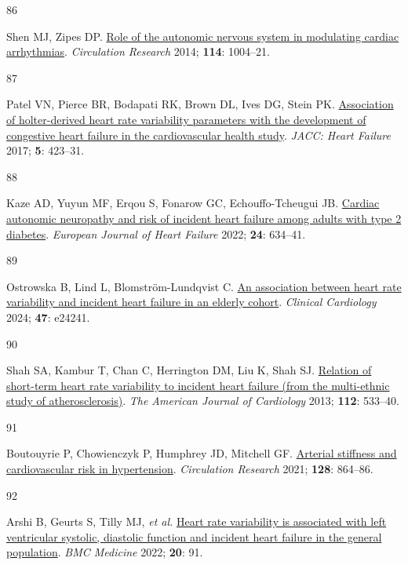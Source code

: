 \documentclass[
  a4paper,
  headsepline=true,
  open=any]{scrbook}
\newlength{\cslhangindent}
\newlength{\csllabelwidth}
\newlength{\cslentryspacingunit} %
\newenvironment{CSLReferences}[2] %
 {%
  \setlength{\parindent}{0pt}
  \ifodd #1
  \let\oldpar\par
  \def\par{\hangindent=\cslhangindent\oldpar}
  \fi
  \setlength{\parskip}{#2\cslentryspacingunit}
 }%
 {}
\newcommand{\CSLLeftMargin}[1]{\parbox[t]{\csllabelwidth}{#1}}
\newcommand{\CSLRightInline}[1]{\parbox[t]{\linewidth - \csllabelwidth}{#1}\break}
\begin{document}
\begin{CSLReferences}{0}{0}
\leavevmode{}%
\CSLLeftMargin{86 }%
\CSLRightInline{Shen MJ, Zipes DP.
\href{https://doi.org/10.1161/CIRCRESAHA.113.302549}{Role of the
autonomic nervous system in modulating cardiac arrhythmias}.
\emph{Circulation Research} 2014; \textbf{114}: 1004--21.}

\leavevmode{}%
\CSLLeftMargin{87 }%
\CSLRightInline{Patel VN, Pierce BR, Bodapati RK, Brown DL, Ives DG,
Stein PK. \href{https://doi.org/10.1016/j.jchf.2016.12.015}{Association
of holter-derived heart rate variability parameters with the development
of congestive heart failure in the cardiovascular health study}.
\emph{JACC: Heart Failure} 2017; \textbf{5}: 423--31.}

\leavevmode{}%
\CSLLeftMargin{88 }%
\CSLRightInline{Kaze AD, Yuyun MF, Erqou S, Fonarow GC,
Echouffo-Tcheugui JB. \href{https://doi.org/10.1002/ejhf.2432}{Cardiac
autonomic neuropathy and risk of incident heart failure among adults
with type 2 diabetes}. \emph{European Journal of Heart Failure} 2022;
\textbf{24}: 634--41.}

\leavevmode{}%
\CSLLeftMargin{89 }%
\CSLRightInline{Ostrowska B, Lind L, Blomström-Lundqvist C.
\href{https://doi.org/10.1002/clc.24241}{An association between heart
rate variability and incident heart failure in an elderly cohort}.
\emph{Clinical Cardiology} 2024; \textbf{47}: e24241.}

\leavevmode{}%
\CSLLeftMargin{90 }%
\CSLRightInline{Shah SA, Kambur T, Chan C, Herrington DM, Liu K, Shah
SJ. \href{https://doi.org/10.1016/j.amjcard.2013.04.018}{Relation of
short-term heart rate variability to incident heart failure (from the
multi-ethnic study of atherosclerosis)}. \emph{The American Journal of
Cardiology} 2013; \textbf{112}: 533--40.}

\leavevmode{}%
\CSLLeftMargin{91 }%
\CSLRightInline{Boutouyrie P, Chowienczyk P, Humphrey JD, Mitchell GF.
\href{https://doi.org/10.1161/CIRCRESAHA.121.318061}{Arterial stiffness
and cardiovascular risk in hypertension}. \emph{Circulation Research}
2021; \textbf{128}: 864--86.}

\leavevmode{}%
\CSLLeftMargin{92 }%
\CSLRightInline{Arshi B, Geurts S, Tilly MJ, \emph{et al.}
\href{https://doi.org/10.1186/s12916-022-02273-9}{Heart rate variability
is associated with left ventricular systolic, diastolic function and
incident heart failure in the general population}. \emph{BMC Medicine}
2022; \textbf{20}: 91.}


\end{CSLReferences}
\end{document}
